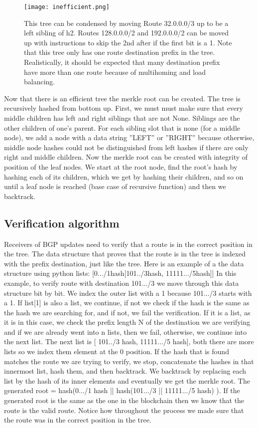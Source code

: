 \documentclass[letterpaper, 10 pt, conference]{ieeeconf}  %
\begin{document}
\begin{figure}[!ht]
	\centering
	\texttt{[image: inefficient.png]}
    \caption{This tree can be condensed by moving Route 32.0.0.0/3 up to be a left sibling of h2. Routes 128.0.0.0/2 and 192.0.0.0/2 can be moved up with instructions to skip the 2nd after if the first bit is a 1. Note that this tree only has one route destination prefix in the tree. Realistically, it should be expected that many destination prefix have more than one route because of multihoming and load balancing.}
    \end{figure}

Now that there is an efficient tree the merkle root can be created. The tree is recursively hashed from bottom up. First, we must must make sure that every middle children has left and right siblings that are not None. Siblings are the other children of one’s parent. For each sibling slot that is none (for a middle node), we add a node with a data string ”LEFT” or ”RIGHT” because otherwise, middle node hashes could not be distinguished from left hashes if there are only right and middle children. Now the merkle root can be created with integrity of position of the leaf nodes. We start at the root node, find the root’s hash by hashing each of its children, which we get by hashing their children, and so on until a leaf node is reached (base case of recursive function) and then we backtrack. 

\subsection{Verification algorithm}

Receivers of BGP updates need to verify that a route is in the correct position in the tree. The data structure that proves that the route is in the tree is indexed with the prefix destination, just like the tree. Here is an example of a the data structure using python lists: [0.../1hash[101../3hash, 11111.../5hash]] In this example, to verify route with destination 101.../3 we move through this data structure bit by bit. We index the outer list with a 1 because 101.../3 starts with a 1. If list[1] is also a list, we continue, if not we check if the hash is the same as the hash we are searching for, and if not, we fail the verification. If it is a list, as it is in this case, we check the prefix length N of the destination we are verifying and if we are already went into n lists, then we fail, otherwise, we continue into the next list. The next list is [ 101../3 hash, 11111.../5 hash], both there are more lists so we index them element at the 0 position. If the hash that is found matches the route we are trying to verify, we stop, concatenate the hashes in that innermost list, hash them, and then backtrack. We backtrack by replacing each list by the hash of its inner elements and eventually we get the merkle root. The generated root = hash(0.../1 hash || hash(101.../3 || 11111.../5 hash) ). If the generated root is the same as the one in the blockchain then we know that the route is the valid route. Notice how throughout the process we made sure that the route was in the correct position in the tree.
\end{document}
